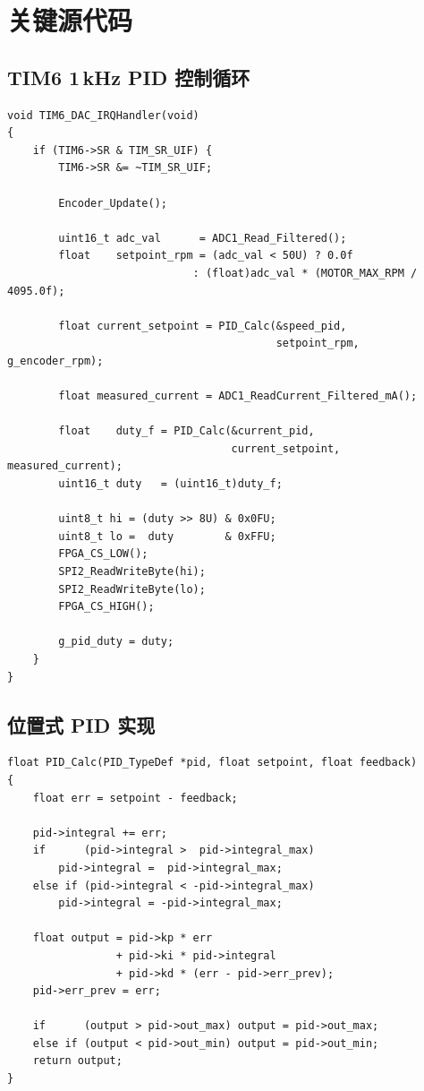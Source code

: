 \documentclass[12pt, a4paper]{ctexrep}
\begin{document}
\appendix

\chapter{关键源代码}

\section{TIM6 1\,kHz PID 控制循环}

\begin{lstlisting}[style=cstyle, caption={TIM6\_DAC\_IRQHandler：1\,kHz 串级PID控制循环。}]
void TIM6_DAC_IRQHandler(void)
{
    if (TIM6->SR & TIM_SR_UIF) {
        TIM6->SR &= ~TIM_SR_UIF;

        Encoder_Update();

        uint16_t adc_val      = ADC1_Read_Filtered();
        float    setpoint_rpm = (adc_val < 50U) ? 0.0f
                             : (float)adc_val * (MOTOR_MAX_RPM / 4095.0f);

        float current_setpoint = PID_Calc(&speed_pid,
                                          setpoint_rpm, g_encoder_rpm);

        float measured_current = ADC1_ReadCurrent_Filtered_mA();

        float    duty_f = PID_Calc(&current_pid,
                                   current_setpoint, measured_current);
        uint16_t duty   = (uint16_t)duty_f;

        uint8_t hi = (duty >> 8U) & 0x0FU;
        uint8_t lo =  duty        & 0xFFU;
        FPGA_CS_LOW();
        SPI2_ReadWriteByte(hi);
        SPI2_ReadWriteByte(lo);
        FPGA_CS_HIGH();

        g_pid_duty = duty;
    }
}
\end{lstlisting}

\section{位置式 PID 实现}

\begin{lstlisting}[style=cstyle, caption={PID\_Calc：带抗积分饱和的位置式PID。}]
float PID_Calc(PID_TypeDef *pid, float setpoint, float feedback)
{
    float err = setpoint - feedback;

    pid->integral += err;
    if      (pid->integral >  pid->integral_max)
        pid->integral =  pid->integral_max;
    else if (pid->integral < -pid->integral_max)
        pid->integral = -pid->integral_max;

    float output = pid->kp * err
                 + pid->ki * pid->integral
                 + pid->kd * (err - pid->err_prev);
    pid->err_prev = err;

    if      (output > pid->out_max) output = pid->out_max;
    else if (output < pid->out_min) output = pid->out_min;
    return output;
}
\end{lstlisting}
\end{document}
